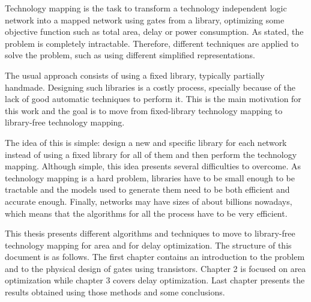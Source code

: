 \documentclass{fmetfm}
\begin{document}
\begin{abstracteng}


\vspace{1cm}

Technology mapping is the task to transform a technology independent logic network into a mapped network using gates from a library, optimizing some objective function such as total area, delay or power consumption. As stated, the problem is completely intractable. Therefore, different techniques are applied to solve the problem, such as using different simplified representations.

The usual approach consists of using a fixed library, typically partially handmade. Designing such libraries is a costly process, specially because of the lack of good automatic techniques to perform it. This is the main motivation for this work and the goal is to move from fixed-library technology mapping to library-free technology mapping. 

The idea of this is simple: design a new and specific library for each network instead of using a fixed library for all of them and then perform the technology mapping. Although simple, this idea presents several difficulties to overcome. As technology mapping is a hard problem, libraries have to be small enough to be tractable and the models used to generate them need to be both efficient and accurate enough. Finally, networks may have sizes of about billions nowadays, which means that the algorithms for all the process have to be very efficient.

This thesis presents different algorithms and techniques to move to library-free technology mapping for area and for delay optimization. The structure of this document is as follows. The first chapter contains an introduction to the problem and to the physical design of gates using transistors. Chapter 2 is focused on area optimization while chapter 3 covers delay optimization. Last chapter presents the results obtained using those methods and some conclusions.
 

\end{abstracteng}


\cleardoublepage

 \tableofcontents
 \cleardoublepage
\end{document}
